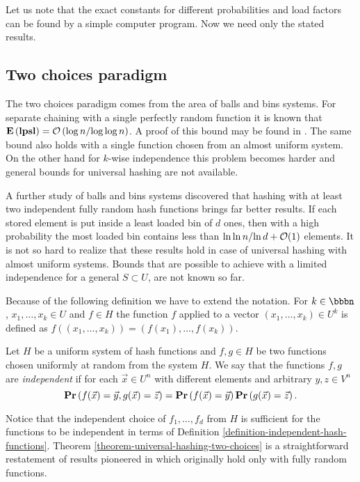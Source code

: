 Let us note that the exact constants for different probabilities and load factors can be found by a simple computer program. Now we need only the stated results.

\subsection{Two choices paradigm}
The two choices paradigm comes from the area of balls and bins systems. For separate chaining with a single perfectly random function it is known that $\mathbf{E}\left(\mathbf{lpsl}\right) = \mathcal{O}\left({\log n}/{\log \log n}\right)$. A proof of this bound may be found in \cite{DBLP:books/sp/Mehlhorn84}. The same bound also holds with a single function chosen from an almost uniform system. On the other hand for $k$-wise independence this problem becomes harder and general bounds for universal hashing are not available.

A further study \cite{DBLP:conf/stoc/AzarBKU94} of balls and bins systems discovered that hashing with at least two independent fully random hash functions brings far better results. If each stored element is put inside a least loaded bin of $d$ ones, then with a high probability the most loaded bin contains less than ${\ln \ln n}/{\ln d} + \mathcal{O}(1)$ elements. It is not so hard to realize that these results hold in case of universal hashing with almost uniform systems. Bounds that are possible to achieve with a limited independence for a general $S \subset U$, are not known so far.

Because of the following definition we have to extend the notation. For $k \in \bbbn$, $x_1, \dots, x_k \in U$ and $f \in H$ the function $f$ applied to a vector $(x_1, \dots, x_k) \in U^k$ is defined as $f((x_1, \dots, x_k)) = (f(x_1), \dots, f(x_k))$.
\begin{definition}
\label{definition-independent-hash-functions}
Let $H$ be a uniform system of hash functions and $f, g \in H$ be two functions chosen uniformly at random from the system $H$. We say that the functions $f, g$ are \emph{independent} if for each $\vec{x} \in U^n$ with different elements and arbitrary $y, z \in V^n$ $$\mathbf{Pr}\left(f(\vec{x}) = \vec{y}, g(\vec{x}) = \vec{z}\right) = \mathbf{Pr}\left(f(\vec{x}) = \vec{y}\right) \mathbf{Pr}\left(g(\vec{x}) = \vec{z}\right).$$
\end{definition}

Notice that the independent choice of $f_1, \dots, f_d$ from $H$ is sufficient for the functions to be independent in terms of Definition \ref{definition-independent-hash-functions}. Theorem \ref{theorem-universal-hashing-two-choices} is a straightforward restatement of results pioneered in \cite{DBLP:conf/stoc/AzarBKU94} which originally hold only with fully random functions.

